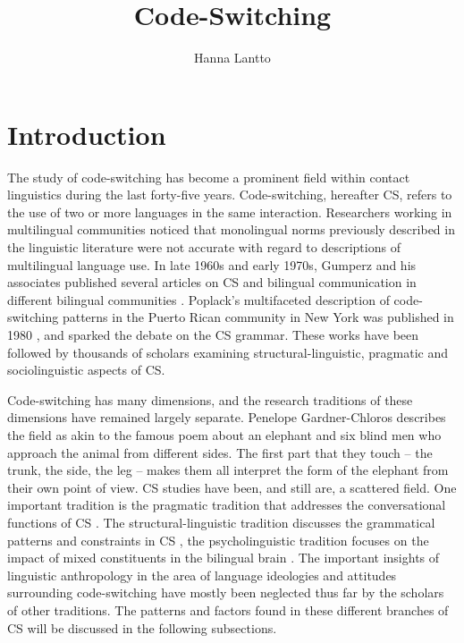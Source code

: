 \documentclass[output=paper,
modfonts
]{langscibook}
\title{Code-Switching}
\author{
 Hanna Lantto\affiliation{University of Turku}}
\begin{document}
\maketitle

\section{Introduction} 

The study of code-switching has become a prominent field within contact linguistics during the last forty-five years. Code-switching, hereafter CS, refers to the use of two or more languages in the same interaction.  Researchers working in multilingual communities noticed that monolingual norms previously described in the linguistic literature were not accurate with regard to descriptions of multilingual language use. In late 1960s and early 1970s, Gumperz and his associates published several articles on CS and bilingual communication in different bilingual communities \parencite{gumperz1964punjabi,gumperz1967linguistic,gumperz1971convergence,blom1972directions}. Poplack’s multifaceted description of code-switching patterns in the Puerto Rican community in New York was published in 1980 \parencite{poplack1980sometimes}, and sparked the debate on the CS grammar. These works have been followed by thousands of scholars examining structural-linguistic, pragmatic and sociolinguistic aspects of CS. 

Code-switching has many dimensions, and the research traditions of these dimensions have remained largely separate. Penelope Gardner-Chloros \parencite{gardner2009code} describes the field as akin to the famous poem about an elephant and six blind men who approach the animal from different sides. The first part that they touch – the trunk, the side, the leg – makes them all interpret the form of the elephant from their own point of view. CS studies have been, and still are, a scattered field. One important tradition is the pragmatic tradition that addresses the conversational functions of CS \parencite{gumperz1982discourse,auer1998code}. The structural-linguistic tradition discusses the grammatical patterns and constraints in CS \parencite{poplack1980sometimes,myers1997duelling, muysken2000}, the psycholinguistic tradition focuses on the impact of mixed constituents in the bilingual brain \parencite{gullberg2009technique,couto2017chapter}. The important insights of linguistic anthropology in the area of language ideologies and attitudes surrounding code-switching  \parencite{woolard1998introduction, woolard2004codeswitching, jaffe2007discourses} have mostly been neglected thus far by the scholars of other traditions. The patterns and factors found in these different branches of CS will be discussed in the following subsections.
\end{document}
